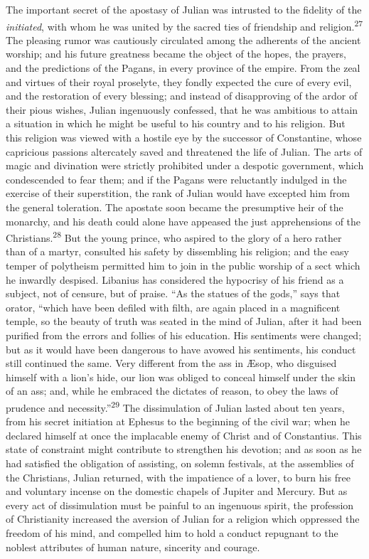 The important secret of the apostasy of Julian was intrusted to
the fidelity of the \textit{initiated}, with whom he was united by the
sacred ties of friendship and religion.\textsuperscript{27} The pleasing rumor was
cautiously circulated among the adherents of the ancient worship;
and his future greatness became the object of the hopes, the
prayers, and the predictions of the Pagans, in every province of
the empire. From the zeal and virtues of their royal proselyte,
they fondly expected the cure of every evil, and the restoration
of every blessing; and instead of disapproving of the ardor of
their pious wishes, Julian ingenuously confessed, that he was
ambitious to attain a situation in which he might be useful to
his country and to his religion. But this religion was viewed
with a hostile eye by the successor of Constantine, whose
capricious passions altercately saved and threatened the life of
Julian. The arts of magic and divination were strictly prohibited
under a despotic government, which condescended to fear them; and
if the Pagans were reluctantly indulged in the exercise of their
superstition, the rank of Julian would have excepted him from the
general toleration. The apostate soon became the presumptive heir
of the monarchy, and his death could alone have appeased the just
apprehensions of the Christians.\textsuperscript{28} But the young prince, who
aspired to the glory of a hero rather than of a martyr, consulted
his safety by dissembling his religion; and the easy temper of
polytheism permitted him to join in the public worship of a sect
which he inwardly despised. Libanius has considered the hypocrisy
of his friend as a subject, not of censure, but of praise. “As
the statues of the gods,” says that orator, “which have been
defiled with filth, are again placed in a magnificent temple, so
the beauty of truth was seated in the mind of Julian, after it
had been purified from the errors and follies of his education.
His sentiments were changed; but as it would have been dangerous
to have avowed his sentiments, his conduct still continued the
same. Very different from the ass in Æsop, who disguised himself
with a lion’s hide, our lion was obliged to conceal himself under
the skin of an ass; and, while he embraced the dictates of
reason, to obey the laws of prudence and necessity.”\textsuperscript{29} The
dissimulation of Julian lasted about ten years, from his secret
initiation at Ephesus to the beginning of the civil war; when he
declared himself at once the implacable enemy of Christ and of
Constantius. This state of constraint might contribute to
strengthen his devotion; and as soon as he had satisfied the
obligation of assisting, on solemn festivals, at the assemblies
of the Christians, Julian returned, with the impatience of a
lover, to burn his free and voluntary incense on the domestic
chapels of Jupiter and Mercury. But as every act of dissimulation
must be painful to an ingenuous spirit, the profession of
Christianity increased the aversion of Julian for a religion
which oppressed the freedom of his mind, and compelled him to
hold a conduct repugnant to the noblest attributes of human
nature, sincerity and courage.

